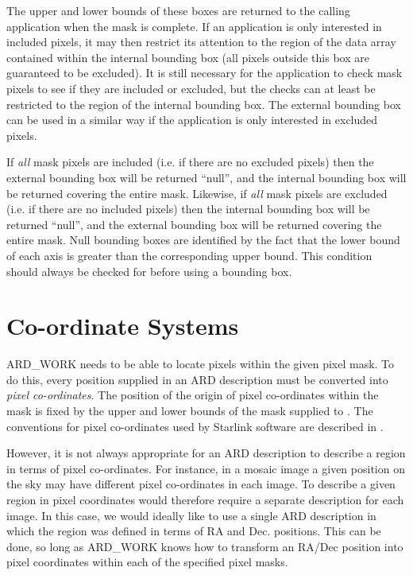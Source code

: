 The upper and lower bounds of these boxes are returned to the calling 
application when the mask is complete. If an application is only interested in 
included pixels, it may then restrict its attention to the region of the data 
array contained within the internal bounding box (all pixels outside this box 
are guaranteed to be excluded). It is still necessary for the application to 
check mask pixels to see if they are included or excluded, but the checks can 
at least be restricted to the region of the internal bounding box. The external 
bounding box can be used in a similar way if the application is only interested 
in excluded pixels.

If {\em all} mask pixels are included (i.e. if there are no excluded pixels)
then the external bounding box will be returned ``null'', and the internal
bounding box will be returned covering the entire mask. Likewise, if {\em all}
mask pixels are excluded (i.e. if there are no included pixels) then the
internal bounding box will be returned ``null'', and the external bounding box
will be returned covering the entire mask. Null bounding boxes are identified by
the fact that the lower bound of each axis is greater than the corresponding
upper bound. This condition should always be checked for before using a 
bounding box. 

\section{\label{SEC:COORD}Co-ordinate Systems}
ARD\_WORK needs to be able to locate pixels within the given pixel mask.
To do this, every position supplied in an ARD description must be
converted into {\em pixel co-ordinates}. The position of the origin of
pixel co-ordinates within the mask is fixed by the upper and lower bounds
of the mask supplied to . The conventions
for pixel co-ordinates used by Starlink software are described in
.

However, it is not always appropriate for an ARD description to describe
a region in terms of pixel co-ordinates. For instance, in a mosaic image
a given position on the sky may have different pixel co-ordinates in each
image. To describe a given region in pixel coordinates would therefore
require a separate description for each image. In this case, we would
ideally like to use a single ARD description in which the region was
defined in terms of RA and Dec. positions. This can be done, so long as
ARD\_WORK knows how to transform an RA/Dec position into pixel
coordinates within each of the specified pixel masks.

